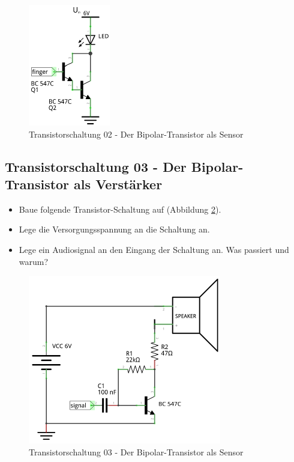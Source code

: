 \begin{figure}[H]
	\centering
	\includegraphics[scale=1.6]{Transistor/Schaltungen/NPN_Sensor.pdf}
	\caption{Transistorschaltung 02 - Der Bipolar-Transistor als Sensor}
	\label{s02}
\end{figure}


\subsection[Der Bipolar-Transistor als Verstärker]{Transistorschaltung 03 - Der Bipolar-Transistor als Verstärker}

\begin{itemize}
\itemsep1pt\parskip0pt
\item Baue folgende Transistor-Schaltung auf (Abbildung \ref{s03}). 
\item Lege die Versorgungsspannung an die Schaltung an.
\item Lege ein Audiosignal an den Eingang der Schaltung an. Was passiert und warum?
\end{itemize}

\begin{figure}[H]
	\centering
	\includegraphics[scale=1.6]{Transistor/Schaltungen/NPN_Verstaerker.pdf}
	\caption{Transistorschaltung 03 - Der Bipolar-Transistor als Sensor}
	\label{s03}
\end{figure}
